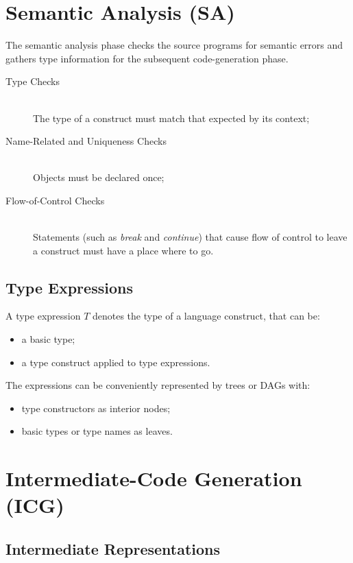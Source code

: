 \chapter{Semantic Analysis (SA)}
The semantic analysis phase checks the source programs for semantic errors and gathers type information for the subsequent code-generation phase.
\begin{description}
    \item[Type Checks]\mbox{} \\
    The type of a construct must match that expected by its context;
    \item[Name-Related and Uniqueness Checks]\mbox{} \\
    Objects must be declared once;
    \item[Flow-of-Control Checks]\mbox{} \\
    Statements (such as \emph{break} and \emph{continue}) that cause flow of control to leave a construct must have a place where to go.
\end{description}

\section{Type Expressions}
A type expression $T$ denotes the type of a language construct, that can be:
\begin{itemize}
    \item a basic type;
    \item a type construct applied to type expressions.
\end{itemize}
The expressions can be conveniently represented by trees or DAGs with:
\begin{itemize}
    \item type constructors as interior nodes;
    \item basic types or type names as leaves.
\end{itemize}

\chapter{Intermediate-Code Generation (ICG)}
\section{Intermediate Representations}
